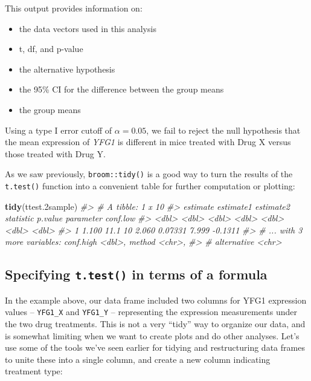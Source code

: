 \documentclass[]{book}
\newenvironment{Shaded}{\begin{snugshade}}{\end{snugshade}}
\newcommand{\CommentTok}[1]{\textcolor[rgb]{0.56,0.35,0.01}{\textit{#1}}}
\newcommand{\FloatTok}[1]{\textcolor[rgb]{0.00,0.00,0.81}{#1}}
\newcommand{\KeywordTok}[1]{\textcolor[rgb]{0.13,0.29,0.53}{\textbf{#1}}}
\newcommand{\NormalTok}[1]{#1}
\providecommand{\tightlist}{%
  \setlength{\itemsep}{0pt}\setlength{\parskip}{0pt}}
\theoremstyle{definition}
\theoremstyle{definition}
\theoremstyle{definition}
\theoremstyle{remark}
\begin{document}
This output provides information on:

\begin{itemize}
\tightlist
\item
  the data vectors used in this analysis
\item
  t, df, and p-value
\item
  the alternative hypothesis
\item
  the 95\% CI for the difference between the group means
\item
  the group means
\end{itemize}

Using a type I error cutoff of \(\alpha = 0.05\), we fail to reject the
null hypothesis that the mean expression of \emph{YFG1} is different in
mice treated with Drug X versus those treated with Drug Y.

As we saw previously, \texttt{broom::tidy()} is a good way to turn the
results of the \texttt{t.test()} function into a convenient table for
further computation or plotting:

\begin{Shaded}
\begin{Highlighting}[]
\KeywordTok{tidy}\NormalTok{(ttest}\FloatTok{.2}\NormalTok{sample)}
\CommentTok{#> # A tibble: 1 x 10}
\CommentTok{#>   estimate estimate1 estimate2 statistic p.value parameter conf.low}
\CommentTok{#>      <dbl>     <dbl>     <dbl>     <dbl>   <dbl>     <dbl>    <dbl>}
\CommentTok{#> 1    1.100      11.1        10     2.060 0.07331     7.999  -0.1311}
\CommentTok{#> # ... with 3 more variables: conf.high <dbl>, method <chr>,}
\CommentTok{#> #   alternative <chr>}
\end{Highlighting}
\end{Shaded}

\hypertarget{specifying-t.test-in-terms-of-a-formula}{%
\subsection{\texorpdfstring{Specifying \texttt{t.test()} in terms of a
formula}{Specifying t.test() in terms of a formula}}\label{specifying-t.test-in-terms-of-a-formula}}

In the example above, our data frame included two columns for YFG1
expression values -- \texttt{YFG1\_X} and \texttt{YFG1\_Y} --
representing the expression measurements under the two drug treatments.
This is not a very ``tidy'' way to organize our data, and is somewhat
limiting when we want to create plots and do other analyses. Let's use
some of the tools we've seen earlier for tidying and restructuring data
frames to unite these into a single column, and create a new column
indicating treatment type:
\end{document}
